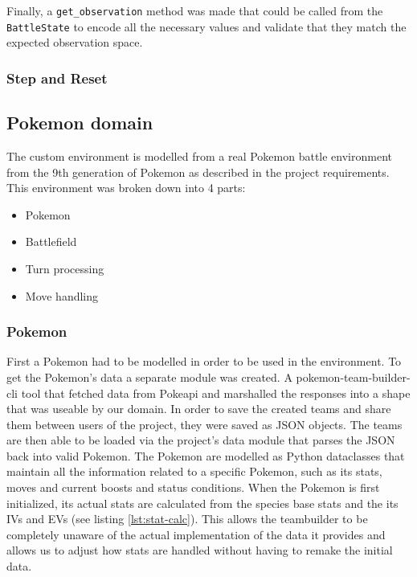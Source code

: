Finally, a \lstinline|get_observation| method was made that could be called from the \lstinline|BattleState| to encode 
all the necessary values and validate that they match the expected observation space.

\subsubsection{Step and Reset}

\subsection{Pokemon domain}
\label{subsec:pokemon-domain}
The custom environment is modelled from a real Pokemon battle environment from the 9th generation of Pokemon as described in the project requirements.
This environment was broken down into 4 parts:
\begin{itemize}
    \item Pokemon
    \item Battlefield
    \item Turn processing
    \item Move handling
\end{itemize}

\subsubsection{Pokemon}
First a Pokemon had to be modelled in order to be used in the environment.
To get the Pokemon's data a separate module was created. A pokemon-team-builder-cli \cite{TeambuilderCli} tool that
fetched data from Pokeapi \cite{PokeAPI} and marshalled the responses into a shape that was useable by our domain.
In order to save the created teams and share them between users of the project, they were saved as JSON objects.
The teams are then able to be loaded via the project's data module that parses the JSON back into valid Pokemon.
The Pokemon are modelled as Python dataclasses that maintain all the information related to a specific Pokemon, such as
its stats, moves and current boosts and status conditions. When the Pokemon is first initialized, its actual stats
are calculated from the species base stats and the its IVs and EVs (see listing \ref{lst:stat-calc}). This allows the teambuilder to be
completely unaware of the actual implementation of the data it provides and allows us to adjust how stats are handled
without having to remake the initial data.

